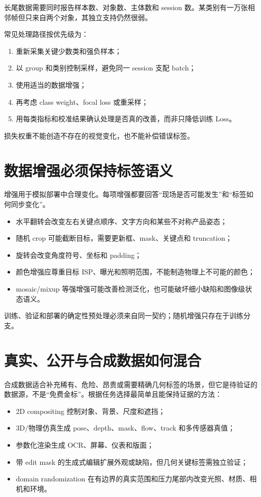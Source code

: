 长尾数据需要同时报告样本数、对象数、主体数和 session 数。某类别有一万张相邻帧但只来自两个对象，其独立支持仍然很弱。

常见处理路径按优先级为：

\begin{enumerate}
  \item 重新采集关键少数类和强负样本；
  \item 以 group 和类别控制采样，避免同一 session 支配 batch；
  \item 使用适当的数据增强；
  \item 再考虑 class weight、focal loss 或重采样；
  \item 用每类指标和校准结果确认处理是否真的改善，而非只降低训练 Loss。
\end{enumerate}

损失权重不能创造不存在的视觉变化，也不能补偿错误标签。

\section{数据增强必须保持标签语义}

增强用于模拟部署中合理变化。每项增强都要回答“现场是否可能发生”和“标签如何同步变化”。

\begin{itemize}
  \item 水平翻转会改变左右关键点顺序、文字方向和某些不对称产品姿态；
  \item 随机 crop 可能截断目标，需要更新框、mask、关键点和 truncation；
  \item 旋转会改变角度符号、坐标和 padding；
  \item 颜色增强应尊重目标 ISP、曝光和照明范围，不能制造物理上不可能的颜色；
  \item mosaic/mixup 等强增强可能改善检测泛化，也可能破坏细小缺陷和图像级状态语义。
\end{itemize}

训练、验证和部署的确定性预处理必须来自同一契约；随机增强只存在于训练分支。

\section{真实、公开与合成数据如何混合}

合成数据适合补充稀有、危险、昂贵或需要精确几何标签的场景，但它是待验证的数据源，不是“免费金标”。根据任务选择最简单且能保持证据的方法：

\begin{itemize}
  \item 2D compositing 控制对象、背景、尺度和遮挡；
  \item 3D/物理仿真生成 pose、depth、mask、flow、track 和多传感器真值；
  \item 参数化渲染生成 OCR、屏幕、仪表和版面；
  \item 带 edit mask 的生成式编辑扩展外观或缺陷，但几何关键标签需独立验证；
  \item domain randomization 在有边界的真实范围和压力尾部内改变光照、材质、相机和环境\cite{domain-randomization}。
\end{itemize}

